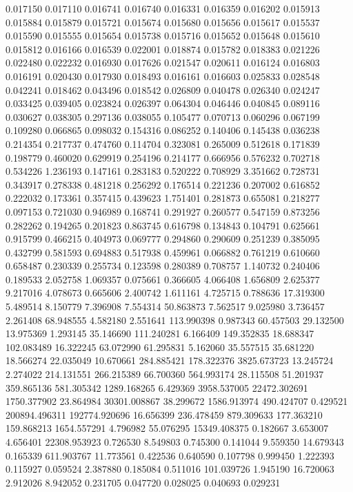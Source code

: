 0.017150
0.017110
0.016741
0.016740
0.016331
0.016359
0.016202
0.015913
0.015884
0.015879
0.015721
0.015674
0.015680
0.015656
0.015617
0.015537
0.015590
0.015555
0.015654
0.015738
0.015716
0.015652
0.015648
0.015610
0.015812
0.016166
0.016539
0.022001
0.018874
0.015782
0.018383
0.021226
0.022480
0.022232
0.016930
0.017626
0.021547
0.020611
0.016124
0.016803
0.016191
0.020430
0.017930
0.018493
0.016161
0.016603
0.025833
0.028548
0.042241
0.018462
0.043496
0.018542
0.026809
0.040478
0.026340
0.024247
0.033425
0.039405
0.023824
0.026397
0.064304
0.046446
0.040845
0.089116
0.030627
0.038305
0.297136
0.038055
0.105477
0.070713
0.060296
0.067199
0.109280
0.066865
0.098032
0.154316
0.086252
0.140406
0.145438
0.036238
0.214354
0.217737
0.474760
0.114704
0.323081
0.265009
0.512618
0.171839
0.198779
0.460020
0.629919
0.254196
0.214177
0.666956
0.576232
0.702718
0.534226
1.236193
0.147161
0.283183
0.520222
0.708929
3.351662
0.728731
0.343917
0.278338
0.481218
0.256292
0.176514
0.221236
0.207002
0.616852
0.222032
0.173361
0.357415
0.439623
1.751401
0.281873
0.655081
0.218277
0.097153
0.721030
0.946989
0.168741
0.291927
0.260577
0.547159
0.873256
0.282262
0.194265
0.201823
0.863745
0.616798
0.134843
0.104791
0.625661
0.915799
0.466215
0.404973
0.069777
0.294860
0.290609
0.251239
0.385095
0.432799
0.581593
0.694883
0.517938
0.459961
0.066882
0.761219
0.610660
0.658487
0.230339
0.255734
0.123598
0.280389
0.708757
1.140732
0.240406
0.189533
2.052758
1.069357
0.075661
0.366605
4.066408
1.656809
2.625377
9.217016
4.078673
0.665606
2.400742
1.611161
4.725715
0.788636
17.319300
5.489514
8.150779
7.396908
7.554314
50.863873
7.562517
9.025980
3.736457
2.261408
68.948555
4.582180
2.551641
113.990398
0.987343
60.457503
29.132500
13.975369
1.293145
35.146690
111.240281
6.166409
149.352835
18.688347
102.083489
16.322245
63.072990
61.295831
5.162060
35.557515
35.681220
18.566274
22.035049
10.670661
284.885421
178.322376
3825.673723
13.245724
2.274022
214.131551
266.215389
66.700360
564.993174
28.115508
51.201937
359.865136
581.305342
1289.168265
6.429369
3958.537005
22472.302691
1750.377902
23.864984
30301.008867
38.299672
1586.913974
490.424707
0.429521
200894.496311
192774.920696
16.656399
236.478459
879.309633
177.363210
159.868213
1654.557291
4.796982
55.076295
15349.408375
0.182667
3.653007
4.656401
22308.953923
0.726530
8.549803
0.745300
0.141044
9.559350
14.679343
0.165339
611.903767
11.773561
0.422536
0.640590
0.107798
0.999450
1.222393
0.115927
0.059524
2.387880
0.185084
0.511016
101.039726
1.945190
16.720063
2.912026
8.942052
0.231705
0.047720
0.028025
0.040693
0.029231
